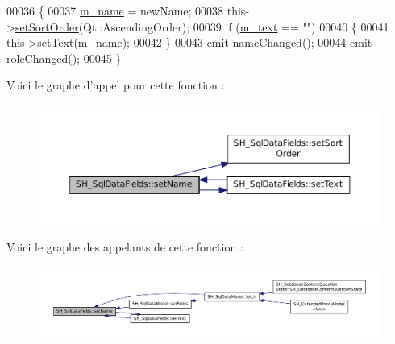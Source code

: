 \begin{DoxyCode}
00036 \{
00037     \hyperlink{classSH__SqlDataFields_a3c0e82a8b6652335bdc53b211d39d4e2}{m\_name} = newName;
00038     this->\hyperlink{classSH__SqlDataFields_a6ace4d4f29e74ce3ed81f75a2c278e83}{setSortOrder}(Qt::AscendingOrder);
00039     \textcolor{keywordflow}{if} (\hyperlink{classSH__SqlDataFields_a55352d3aea0863fcab26c948babe8523}{m\_text} == \textcolor{stringliteral}{""})
00040     \{
00041         this->\hyperlink{classSH__SqlDataFields_a377b4964546e91bd344c8c6f5190a833}{setText}(\hyperlink{classSH__SqlDataFields_a3c0e82a8b6652335bdc53b211d39d4e2}{m\_name});
00042     \}
00043     emit \hyperlink{classSH__SqlDataFields_ae3d52ec9938ab55f18ecdbcc5a8fd761}{nameChanged}();
00044     emit \hyperlink{classSH__SqlDataFields_a2f98ae1dff83fc150b9e836ad782e6bf}{roleChanged}();
00045 \}
\end{DoxyCode}


Voici le graphe d'appel pour cette fonction \-:\nopagebreak
\begin{figure}[H]
\begin{center}
\leavevmode
\includegraphics[width=350pt]{classSH__SqlDataFields_ab658a817f459e5d0a8c0f5c4e8c28a9d_cgraph}
\end{center}
\end{figure}




Voici le graphe des appelants de cette fonction \-:\nopagebreak
\begin{figure}[H]
\begin{center}
\leavevmode
\includegraphics[width=350pt]{classSH__SqlDataFields_ab658a817f459e5d0a8c0f5c4e8c28a9d_icgraph}
\end{center}
\end{figure}


